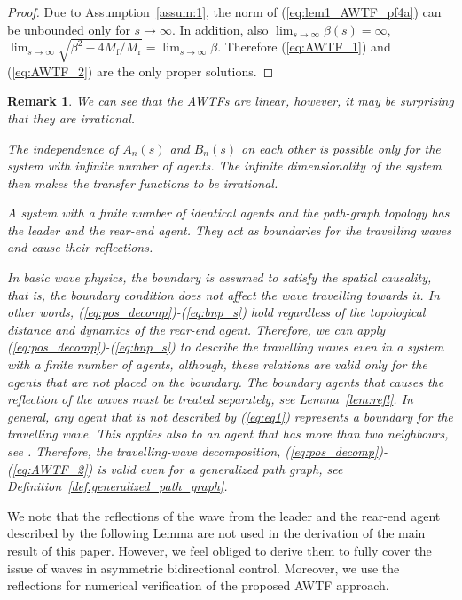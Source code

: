 \documentclass[10pt,twocolumn,twoside]{IEEEtran}
\newtheorem*{rem*}{Remark}
\theoremstyle{definition}
\newcommand{\revA}{Black}
\newcommand{\revB}{Black}
\begin{document}
\begin{proof}
Due to Assumption~\ref{assum:1}, the norm of (\ref{eq:lem1_AWTF_pf4a}) can be unbounded only for $s \rightarrow \infty$. In addition, also $\lim_{s\rightarrow \infty} \beta(s) = \infty$, $\lim_{s \rightarrow \infty} \sqrt{\beta^2-4M_{\text{f}}/M_{\text{r}}} = \lim_{s \rightarrow \infty} \beta$. Therefore {\color{\revB} (\ref{eq:AWTF_1}) and (\ref{eq:AWTF_2}) are the only proper solutions.}





\end{proof}



\begin{rem*}
We can see that the AWTFs are linear, however, it may be surprising that they are irrational. {\color{\revB}The independence of $A_n(s)$ and $B_n(s)$ on each other is possible only for the system with infinite number of agents. The infinite dimensionality of the system then makes the transfer functions to be irrational.



A system with a finite number of identical agents and the path-graph topology has the leader and the rear-end agent. They act as boundaries for the travelling waves and cause their reflections.} In basic wave physics, the boundary is assumed to satisfy the spatial causality, that is, the boundary condition does not affect the wave travelling towards it. In other words, (\ref{eq:pos_decomp})-(\ref{eq:bnp_s}) hold regardless of the topological distance and dynamics of the rear-end agent. Therefore, we can apply (\ref{eq:pos_decomp})-(\ref{eq:bnp_s}) to describe the travelling waves even in a system with a finite number of agents, although, these relations are valid only for the agents that are not placed on the boundary. The boundary agents that causes the reflection of the waves must be treated separately, see Lemma~\ref{lem:refl}. In general, any agent that is not described by (\ref{eq:eq1}) represents a boundary for the travelling wave. This applies also to an agent that has more than two neighbours, see \cite{Martinec2015b}. Therefore, the travelling-wave decomposition, (\ref{eq:pos_decomp})-(\ref{eq:AWTF_2}) is valid even for a {\color{\revA}generalized path graph, see Definition~\ref{def:generalized_path_graph}}.



\end{rem*}



We note that the reflections of the wave from the leader and the rear-end agent described by the following Lemma are not used in the derivation of the main result of this paper. However, we feel obliged to derive them to fully cover the issue of waves in asymmetric bidirectional control. Moreover, we use the reflections for numerical verification of the proposed AWTF approach.
\end{document}
